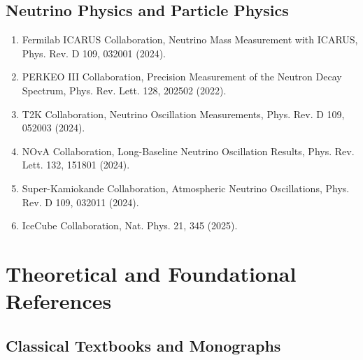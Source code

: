 \documentclass[12pt,oneside]{book}
\begin{document}
\subsection{Neutrino Physics and Particle Physics}

\begin{enumerate}
    \item Fermilab ICARUS Collaboration, Neutrino Mass Measurement with ICARUS, Phys. Rev. D 109, 032001 (2024).
    \item PERKEO III Collaboration, Precision Measurement of the Neutron Decay Spectrum, Phys. Rev. Lett. 128, 202502 (2022).
    \item T2K Collaboration, Neutrino Oscillation Measurements, Phys. Rev. D 109, 052003 (2024).
    \item NOvA Collaboration, Long-Baseline Neutrino Oscillation Results, Phys. Rev. Lett. 132, 151801 (2024).
    \item Super-Kamiokande Collaboration, Atmospheric Neutrino Oscillations, Phys. Rev. D 109, 032011 (2024).
    \item IceCube Collaboration, Nat. Phys. 21, 345 (2025).
\end{enumerate}

\section{Theoretical and Foundational References}

\subsection{Classical Textbooks and Monographs}
\end{document}
